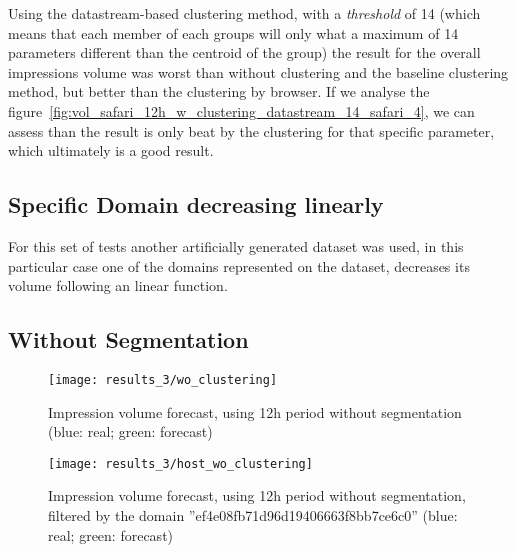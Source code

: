 Using the datastream-based clustering method, with a \emph{threshold} of 14
(which means that each member of each groups will only what a maximum of 14
parameters different than the centroid of the group) the result for the overall
impressions volume was worst than without clustering and the baseline clustering
method, but better than the clustering by browser. If we analyse the
figure~\ref{fig:vol_safari_12h_w_clustering_datastream_14_safari_4}, we can
assess than the result is only beat by the clustering for that specific
parameter, which ultimately is a good result.

\subsection{Specific Domain decreasing linearly}

For this set of tests another artificially generated dataset was used, in this
particular case one of the domains represented on the dataset, decreases its
volume following an linear function.

\subsection*{Without Segmentation}

\begin{figure}[!ht]
\centering
\begin{minipage}[t]{0.45\linewidth}
\texttt{[image: results\_3/wo\_clustering]} \caption[Volume
impression forecast, without segmentation]{Impression volume
forecast, using 12h period without segmentation (blue: real; green: forecast)}
\label{fig:vol_domain_wo_segmentation}
\end{minipage}
\quad
\begin{minipage}[t]{0.45\linewidth}
\texttt{[image: results\_3/host\_wo\_clustering]} \caption[Volume
impression forecast, without segmentation]{Impression volume
forecast, using 12h period without segmentation, filtered by the domain ''ef4e08fb71d96d19406663f8bb7ce6c0'' (blue: real; green: forecast)}
\label{fig:vol_domain_wo_segmentation_filtered}
\end{minipage}

\end{figure}

